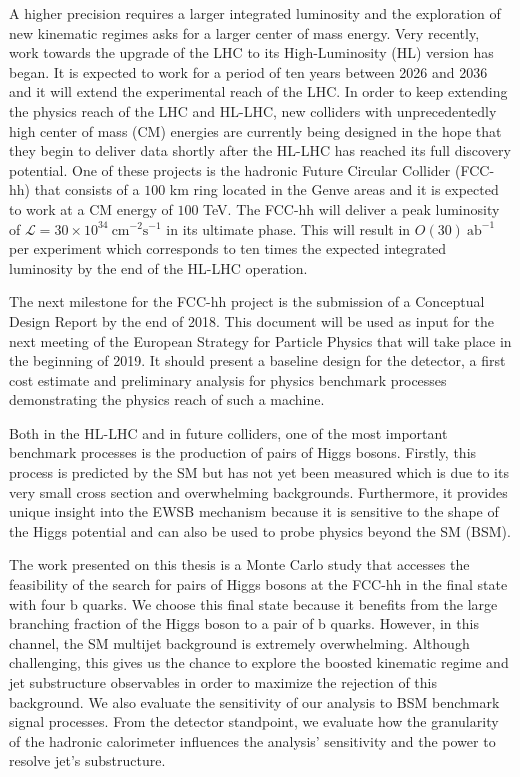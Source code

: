 A higher precision requires a larger integrated luminosity and the exploration of new kinematic regimes asks for a larger center of mass energy. Very recently, work towards the upgrade of the LHC to its High-Luminosity (HL) version has began. It is expected to work for a period of ten years between 2026 and 2036 and it will extend the experimental reach of the LHC. In order to keep extending the physics reach of the LHC and HL-LHC, new colliders with unprecedentedly high center of mass (CM) energies are currently being designed in the hope that they begin to deliver data shortly after the HL-LHC has reached its full discovery potential. One of these projects is the hadronic Future Circular Collider (FCC-hh) that consists of a $100$ km ring located in the Genve areas and it is expected to work at a CM energy of $100$ TeV. The FCC-hh will deliver a peak luminosity of $\mathcal{L}=30\times 10^{34}~\text{cm}^{-2}\text{s}^{-1}$ in its ultimate phase. This will result in $O(30)~\text{ab}^{-1}$ per experiment which corresponds to ten times the expected integrated luminosity by the end of the HL-LHC operation. 

The next milestone for the FCC-hh project is the submission of a Conceptual Design Report by the end of 2018. This document will be used as input for the next meeting of the European Strategy for Particle Physics that will take place in the beginning of 2019. It should present a baseline design for the detector, a first cost estimate and preliminary analysis for physics benchmark processes demonstrating the physics reach of such a machine.

Both in the HL-LHC and in future colliders, one of the most important benchmark processes is the production of pairs of Higgs bosons. Firstly, this process is predicted by the SM but has not yet been measured which is due to its very small cross section and overwhelming backgrounds. Furthermore, it provides unique insight into the EWSB mechanism because it is sensitive to the shape of the Higgs potential and can also be used to probe physics beyond the SM (BSM).



The work presented on this thesis is a Monte Carlo study that accesses the feasibility of the search for pairs of Higgs bosons at the FCC-hh in the final state with four b quarks. We choose this final state because it benefits from the large branching fraction of the Higgs boson to a pair of b quarks. However, in this channel, the SM multijet background is extremely overwhelming. Although challenging, this gives us the chance to explore the boosted kinematic regime and jet substructure observables in order to maximize the rejection of this background. We also evaluate the sensitivity of our analysis to BSM benchmark signal processes. From the detector standpoint, we evaluate how the granularity of the hadronic calorimeter influences the analysis' sensitivity and the power to resolve jet's substructure.


